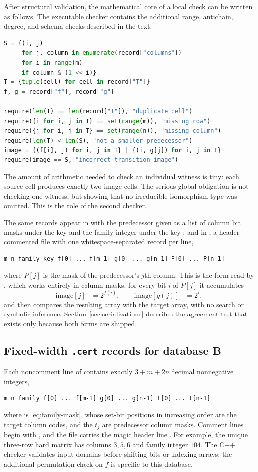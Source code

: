 \documentclass[11pt,letterpaper]{article}
\numberwithin{equation}{section}
\theoremstyle{definition}
\theoremstyle{remark}
\newcommand{\code}[1]{\texttt{\detokenize{#1}}}
\newcommand{\dbB}{\textsf{B}}
\begin{document}
After structural validation, the mathematical core of a local check can
be written as follows. The executable checker contains the additional
range, antichain, degree, and schema checks described in the text.
\begin{lstlisting}[language=Python]
S = {(i, j)
     for j, column in enumerate(record["columns"])
     for i in range(m)
     if column & (1 << i)}
T = {tuple(cell) for cell in record["T"]}
f, g = record["f"], record["g"]

require(len(T) == len(record["T"]), "duplicate cell")
require({i for i, j in T} == set(range(m)), "missing row")
require({j for i, j in T} == set(range(n)), "missing column")
require(len(T) < len(S), "not a smaller predecessor")
image = {(f[i], j) for i, j in T} | {(i, g[j]) for i, j in T}
require(image == S, "incorrect transition image")
\end{lstlisting}

The amount of arithmetic needed to check an individual witness is tiny:
each source cell produces exactly two image cells. The serious global
obligation is not checking one witness, but showing that no irreducible
isomorphism type was omitted. This is the role of the second checker.

The same records appear in  with the
predecessor given as a list of column bit masks under the key
\code{predecessor} and the family integer under the key \code{key}; and in
, a header-commented file with one
whitespace-separated record per line,
\begin{lstlisting}
m n family_key f[0] ... f[m-1] g[0] ... g[n-1] P[0] ... P[n-1]
\end{lstlisting}
where $P[j]$ is the mask of the predecessor's $j$th column. This is the
form read by , which works entirely in column masks:
for every bit $i$ of $P[j]$ it accumulates
\[
 \mathrm{image}[j]\mathrel{|}=2^{f(i)},\qquad
 \mathrm{image}[g(j)]\mathrel{|}=2^{i},
\]
and then compares the resulting array with the target array, with no search
or symbolic inference. Section~\ref{sec:serializations} describes the
agreement test that exists only because both forms are shipped.

\subsection{Fixed-width \texttt{.cert} records for database \dbB{}}
Each noncomment line of  contains exactly
$3+m+2n$ decimal nonnegative integers,
\begin{lstlisting}
m n family f[0] ... f[m-1] g[0] ... g[n-1] t[0] ... t[n-1]
\end{lstlisting}
where \code{family} is \eqref{eq:family-mask}, whose set-bit positions in
increasing order are the target column codes, and the $t_j$ are predecessor
column masks. Comment lines begin with \code{#}, and the file carries the
magic header line \code{# SHUFFLE-FULL-SUPPORT-1}. For example, the unique
three-row hard matrix has columns $3,5,6$ and family integer $104$. The C++
checker validates input domains before shifting bits or indexing arrays; the
additional permutation check on $f$ is specific to this database.
\end{document}
